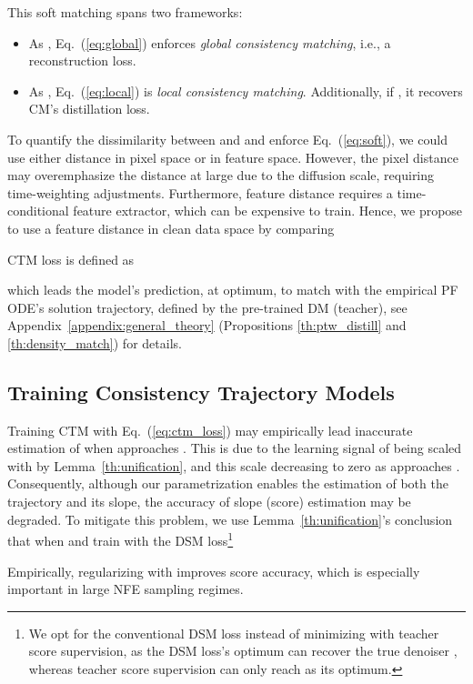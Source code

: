 \documentclass{article} \usepackage{iclr2024_coNFErence,times}
\def\eqref#1{equation~\ref{#1}}
\def\eqref#1{(\ref{#1})}
\def\eqref#1{(\ref{#1})}
\theoremstyle{definition}
\theoremstyle{remark}
\begin{document}
This soft matching spans two frameworks:
\begin{itemize}
\item As , Eq.~\eqref{eq:global} enforces \emph{global consistency matching}, i.e., a reconstruction loss.
\item As , Eq.~\eqref{eq:local} is \textit{local consistency matching}. Additionally, if , it recovers CM's distillation loss.
\end{itemize}

To quantify the dissimilarity between  and  and enforce Eq.~\eqref{eq:soft}, we could use either  distance in pixel space or in feature space. However, the pixel distance may overemphasize the distance at large  due to the diffusion scale, requiring time-weighting adjustments. Furthermore, feature distance requires a time-conditional feature extractor, which can be expensive to train. Hence, we propose to use a feature distance  in clean data space by comparing

CTM loss is defined as

which leads the model's prediction, at optimum, to match with the empirical PF ODE's solution trajectory, defined by the pre-trained DM (teacher), see Appendix~\ref{appendix:general_theory} (Propositions \ref{th:ptw_distill} and \ref{th:density_match}) for details.

\subsection{Training Consistency Trajectory Models}

Training CTM with Eq.~\eqref{eq:ctm_loss} may empirically lead inaccurate estimation of  when  approaches . This is due to the learning signal of  being scaled with  by Lemma~\ref{th:unification}, and this scale decreasing to zero as  approaches . Consequently, although our parametrization enables the estimation of both the trajectory and its slope, the accuracy of slope (score) estimation may be degraded. To mitigate this problem, we use Lemma~\ref{th:unification}'s conclusion that
 when  and train  with the DSM loss\footnote{We opt for the conventional DSM loss instead of minimizing   with teacher score supervision, as the DSM loss's optimum can recover the true denoiser , whereas teacher score supervision can only reach  as its optimum.}

Empirically, regularizing  with  improves score accuracy, which is especially important in large NFE sampling regimes.
\end{document}
